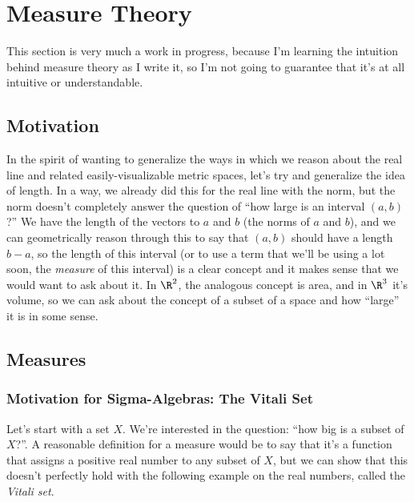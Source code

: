 \documentclass[./analysis.tex]{subfiles}
\begin{document}
    \section{Measure Theory}
    This section is very much a work in progress, because I'm learning the intuition behind measure theory as I write it, so I'm not going to guarantee that it's at all intuitive or understandable.

    \subsection{Motivation}

    In the spirit of wanting to generalize the ways in which we reason about the real line and related easily-visualizable metric spaces, let's try and generalize the idea of length. In a way, we already did this for the real line with the norm, but the norm doesn't completely answer the question of ``how large is an interval $(a, b)$?'' We have the length of the vectors to $a$ and $b$ (the norms of $a$ and $b$), and we can geometrically reason through this to say that $(a, b)$ should have a length $b - a$, so the length of this interval (or to use a term that we'll be using a lot soon, the \emph{measure} of this interval) is a clear concept and it makes sense that we would want to ask about it. In $\R^2$, the analogous concept is area, and in $\R^3$ it's volume, so we can ask about the concept of a subset of a space and how ``large'' it is in some sense.


    \subsection{Measures}

    \subsubsection{Motivation for Sigma-Algebras: The Vitali Set}

    Let's start with a set $X$. We're interested in the question: ``how big is a subset of $X$?''. A reasonable definition for a measure would be to say that it's a function that assigns a positive real number to any subset of $X$, but we can show that this doesn't perfectly hold with the following example on the real numbers, called the \emph{Vitali set}. 
\end{document}
